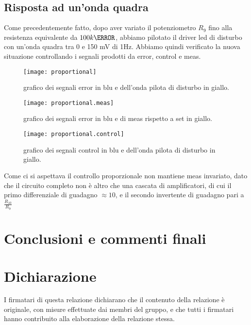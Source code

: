 \documentclass[10pt, a4paper, italian]{article}
\begin{document}
\subsection{Risposta ad un'onda quadra}
Come precedentemente fatto, dopo aver variato il potenziometro $R_9$ fino alla resistenza equivalente da $100 k\ohm$, abbiamo pilotato il driver led di disturbo con un'onda quadra tra 0 e 150 mV di 1Hz. Abbiamo quindi verificato la nuova situazione controllando i segnali prodotti da error, control e meas.
\begin{figure}[H]
    \centering
	\texttt{[image: proportional]}
    \caption{grafico dei segnali error in blu e dell'onda pilota di disturbo in giallo.
    \label{fig: Draft1}}
\end{figure}
\begin{figure}[H]
    \centering
	\texttt{[image: proportional.meas]}
    \caption{grafico dei segnali error in blu e di meas rispetto a set in giallo.
    \label{fig: Draft1}}
\end{figure}
\begin{figure}[H]
    \centering
	\texttt{[image: proportional.control]}
    \caption{grafico dei segnali control in blu e dell'onda pilota di disturbo in giallo.
    \label{fig: Draft1}}
\end{figure}
Come ci si aspettava il controllo proporzionale non mantiene meas invariato, dato che il circuito completo non è altro che una cascata di amplificatori, di cui il primo differenziale di guadagno $\approx 10$, e il secondo invertente di guadagno pari a $\frac{R_{10}}{R_9}$
\section*{Conclusioni e commenti finali}


\section*{Dichiarazione}
I firmatari di questa relazione dichiarano che il contenuto della relazione \`e
originale, con misure effettuate dai membri del gruppo, e che tutti i firmatari
hanno contribuito alla elaborazione della relazione stessa.
\end{document}
